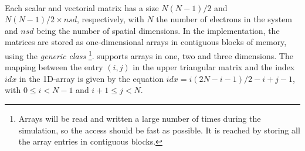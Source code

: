 \\
Each scalar and vectorial matrix has a size $N(N-1)/2$ and $N(N-1)/2 \times nsd$, respectively, with $N$  the number of electrons in the system and $nsd$ being the number of spatial dimensions. In the implementation, the matrices are stored as one-dimensional arrays in contiguous blocks of memory, using the \emph{generic class} \footnote{Arrays will be read and written a large number of times during the simulation, so the access should be fast as possible. It is reached by storing all the array entries in contiguous blocks\cite{Langtangen2000}.}.  supports arrays in one, two and three dimensions. The mapping between the entry $(i,j)$ in the upper triangular matrix and the index $idx$ in the 1D-array is given by the equation $idx = i(2 N - i-1)/2 - i + j - 1$, with $0\leq i < N-1$ and $i+1 \leq j < N$.

